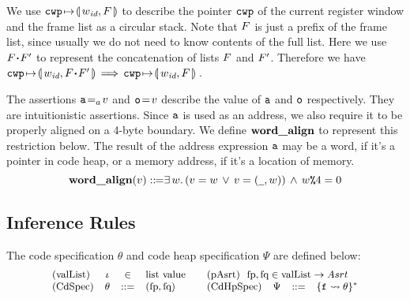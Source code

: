 We use $\texttt{cwp}\!\mapsto\!\llparenthesis\, w_{\textit{id}},F\,\rrparenthesis$ to describe the pointer
$\texttt{cwp}$ of the current register window and the frame
list as a circular stack.
Note that $F$ is just a prefix of the frame list,
since usually we do not need to know contents of
the full list. Here we use $F \!\bm{\cdot}\! F'$ to
represent the concatenation of lists $F$ and $F'$.
Therefore we have
$
\texttt{cwp}\!\mapsto\!\llparenthesis\, w_{\textit{id}},F \!\bm{\cdot}\! F'\,\rrparenthesis \,\Longrightarrow\,
\texttt{cwp}\!\mapsto\!\llparenthesis\, w_{\textit{id}},F\,\rrparenthesis
$\,.


The assertions ${\texttt{a}}\!=_{a}\!{v}$ and ${\texttt{o}}\!=\!{v}$
describe the value of $\texttt{a}$ and $\texttt{o}$ respectively. They are
intuitionistic assertions. Since $\texttt{a}$ is used as an address,
we also require it to be properly aligned on a 4-byte boundary.
We define $\textbf{word\_align}{}$ to represent this restriction below.
The result of the address expression $\texttt{a}$ may be a word, if
it's a pointer in code heap, or a memory address, if it's a location
of memory.
\[
	\textbf{word\_align}{(v)} ::\!\!{=}
	\exists \, w. \,
	(v = w \, \lor \, v = (\underline{\ \,}, w))
	\, \land \, w\texttt{\%}{4} = 0
\]

\subsection{Inference Rules}
\label{subsec:inference rules}
\newcommand{\tinybftext}[1]{\textbf{\scriptsize{#1}}}


The code specification $\theta$ and code heap specification $\Psi$
are defined below:
\[
	\small
	\begin{array}{lccllccl}
		\text{(valList)} & \lgvl & \in & \text{list value}
			&
		\multicolumn{4}{l}
		{
			\quad
			\text{(pAsrt)} \ \
			\specpre,\specpost \in
			\text{valList} \rightarrow Asrt
		}
		\\
		
		\text{(CdSpec)} & \Bspec & ::= & (\specpre, \specpost)
			& \quad
		
		\text{(CdHpSpec)} & \Cspec & ::= & \{\lab{} \rightsquigarrow \Bspec\}^{*}
	\end{array}
\]

